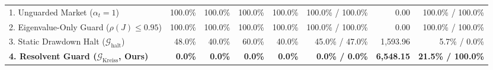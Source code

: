 \begin{table}[htbp]
{\begin{tabular}{lrrrrrrr}
\midrule
1. Unguarded Market ($\alpha_t = 1$) & 100.0\% & 100.0\% & 100.0\% & 100.0\% & 100.0\% / 100.0\% & 0.00 & 100.0\% / 100.0\% \\
2. Eigenvalue-Only Guard ($\rho(J) \le 0.95$) & 100.0\% & 100.0\% & 100.0\% & 100.0\% & 100.0\% / 100.0\% & 0.00 & 100.0\% / 100.0\% \\
3. Static Drawdown Halt ($\mathcal{G}_{\mathrm{halt}}$) & 48.0\% & 40.0\% & 60.0\% & 40.0\% & 45.0\% / 47.0\% & 1,593.96 & 5.7\% / 0.0\% \\
\textbf{4. Resolvent Guard ($\mathcal{G}_{\mathrm{Kreiss}}$, Ours)} & \textbf{0.0\%} & \textbf{0.0\%} & \textbf{0.0\%} & \textbf{0.0\%} & \textbf{0.0\% / 0.0\%} & \textbf{6,548.15} & \textbf{21.5\% / 100.0\%} \\
\bottomrule
\end{tabular}%
}
\end{table}
